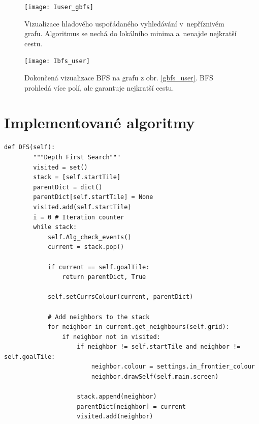 \documentclass[12pt]{report}			%
\begin{document}
\begin{appendices}
\begin{figure}[h]
\begin{minipage}[outer sep=0]{\textwidth}
\begin{minipage}[t]{0.48\textwidth}
  			\texttt{[image: Iuser\_gbfs]}\caption{Vizualizace hladového uspořádaného vyhledávání v~nepříznivém grafu. Algoritmus se nechá  do lokálního minima a~nenajde nejkratší cestu.}\label{gbfs_user}
			
    \end{minipage}\hfill
    \begin{minipage}[t]{0.48\textwidth}
\texttt{[image: Ibfs\_user]}\caption{Dokončená vizualizace BFS na grafu z obr. \ref{gbfs_user}. BFS prohledá více polí, ale garantuje nejkratší cestu.}\label{bfs_user}
    \end{minipage}
    \end{minipage}\vspace{1ex}
\end{figure}






	
	\chapter{Implementované algoritmy}\label{idk}
	
	\begin{lstlisting}[caption={Algoritmus DFS},captionpos=b]
	def DFS(self):
        """Depth First Search"""
        visited = set()
        stack = [self.startTile]
        parentDict = dict()
        parentDict[self.startTile] = None
        visited.add(self.startTile)
        i = 0 # Iteration counter
        while stack:
            self.Alg_check_events()
            current = stack.pop()

            if current == self.goalTile:
                return parentDict, True

            self.setCurrsColour(current, parentDict)

            # Add neighbors to the stack
            for neighbor in current.get_neighbours(self.grid):
                if neighbor not in visited:
                    if neighbor != self.startTile and neighbor != self.goalTile:
                        neighbor.colour = settings.in_frontier_colour
                        neighbor.drawSelf(self.main.screen)

                    stack.append(neighbor)
                    parentDict[neighbor] = current
                    visited.add(neighbor)


\end{lstlisting}
\end{appendices}
\end{document}
